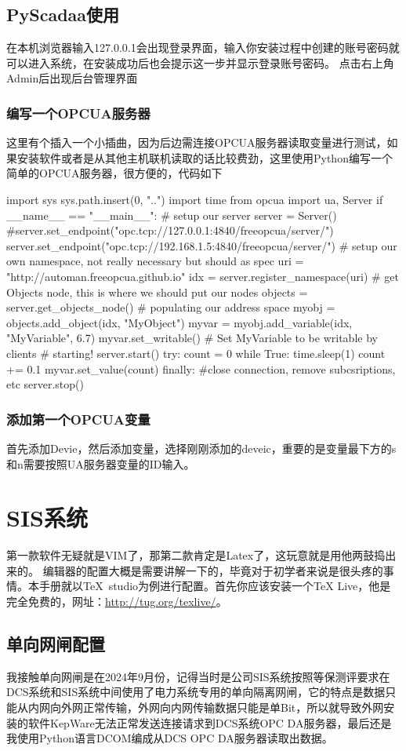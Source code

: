 \subsection{PyScadaa使用}
在本机浏览器输入127.0.0.1会出现登录界面，输入你安装过程中创建的账号密码就可以进入系统，在安装成功后也会提示这一步并显示登录账号密码。
点击右上角Admin后出现后台管理界面
\subsubsection{编写一个OPCUA服务器}
这里有个插入一个小插曲，因为后边需连接OPCUA服务器读取变量进行测试，如果安装软件或者是从其他主机联机读取的话比较费劲，这里使用Python编写一个简单的OPCUA服务器，很方便的，代码如下
\begin{shell}
import sys
sys.path.insert(0, "..")
import time
from opcua import ua, Server
if __name__ == "__main__":
    # setup our server
    server = Server()
    #server.set_endpoint("opc.tcp://127.0.0.1:4840/freeopcua/server/")
    server.set_endpoint("opc.tcp://192.168.1.5:4840/freeopcua/server/")
    # setup our own namespace, not really necessary but should as spec
    uri = "http://automan.freeopcua.github.io"
    idx = server.register_namespace(uri)
    # get Objects node, this is where we should put our nodes
    objects = server.get_objects_node()
    # populating our address space
    myobj = objects.add_object(idx, "MyObject")
    myvar = myobj.add_variable(idx, "MyVariable", 6.7)
    myvar.set_writable()    # Set MyVariable to be writable by clients
    # starting!
    server.start()
    try:
        count = 0
        while True:
            time.sleep(1)
            count += 0.1
            myvar.set_value(count)
    finally:
        #close connection, remove subcsriptions, etc
        server.stop()
\end{shell}
\subsubsection{添加第一个OPCUA变量}
首先添加Devie，然后添加变量，选择刚刚添加的deveic，重要的是变量最下方的s和n需要按照UA服务器变量的ID输入。
\section{SIS系统}
	第一款软件无疑就是VIM了，那第二款肯定是Latex了，这玩意就是用他两鼓捣出来的。	编辑器的配置大概是需要讲解一下的，毕竟对于初学者来说是很头疼的事情。本手册就以\TeX\ studio为例进行配置。首先你应该安装一个\TeX{} Live，他是完全免费的，网址：\url{http://tug.org/texlive/}。
\subsection{单向网闸配置}
我接触单向网闸是在2024年9月份，记得当时是公司SIS系统按照等保测评要求在DCS系统和SIS系统中间使用了电力系统专用的单向隔离网闸，它的特点是数据只能从内网向外网正常传输，外网向内网传输数据只能是单Bit，所以就导致外网安装的软件KepWare无法正常发送连接请求到DCS系统OPC DA服务器，最后还是我使用Python语言DCOM编成从DCS OPC DA服务器读取出数据。
